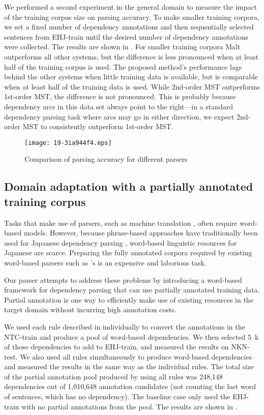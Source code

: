 \documentclass[english]{jnlp_1.4}
\def\figref#1{}
\def\secref#1{}
\begin{document}
We performed a second experiment in the general domain to measure the impact of the training corpus
size on parsing accuracy. To make smaller training corpora, we set a fixed number of dependency
annotations and then sequentially selected sentences from EHJ-train until the desired number of
dependency annotations were collected. The results are shown in \figref{figure:ACC}. For smaller
training corpora Malt outperforms all other systems, but the difference is less pronounced when at
least half of the training corpus is used. The proposed method's performance lags behind the other
systems when little training data is available, but is comparable when at least half of the training
data is used. While 2nd-order MST outperforms 1st-order MST, the difference is not pronounced. This
is probably because dependency arcs in this data set always point to the right---in a standard
dependency parsing task where arcs may go in either direction, we expect 2nd-order MST to
consistently outperform 1st-order MST.

\begin{figure}[t]
  \begin{center}
  \texttt{[image: 19-3ia944f4.eps]}
  \end{center}
  \caption{Comparison of parsing accuracy for different parsers}
  \label{figure:ACC}
\end{figure}



\subsection{Domain adaptation with a partially annotated training corpus}

Tasks that make use of parsers, such as machine translation \cite{yamada01syntaxbasedmt}, often
require word-based models. However, because phrase-based approaches have traditionally been used for
Japanese dependency parsing \cite{kudo2002,sassano2010using}, word-based linguistic resources for
Japanese are scarce. Preparing the fully annotated corpora required by existing word-based parsers
such as 's is an expensive and laborious task.

Our parser attempts to address these problems by introducing a word-based framework for
dependency parsing that can use partially annotated training data. Partial annotation is one way
to efficiently make use of existing resources in the target domain without incurring high annotation costs. 

We used each rule described in \secref{sec:conversion_rules} individually to convert the annotations
in the NTC-train and produce a pool of word-based dependencies. We then selected 5~k of those
dependencies to add to EHJ-train, and measured the results on NKN-test. We also used all rules
simultaneously to produce word-based dependencies and measured the results in the same way as the
individual rules. The total size of the partial annotation pool produced by using all rules was
248,148 dependencies out of 1,010,648 annotation candidates (not counting the last word of
sentences, which has no dependency). The baseline case only used the EHJ-train with no partial
annotations from the pool. The results are shown in \figref{figure:rules}.
\end{document}
